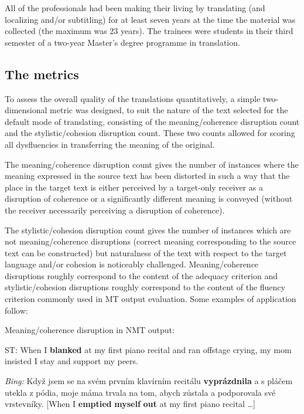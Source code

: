 \documentclass[output=paper]{langscibook}
\begin{document}
All of the professionals had been making their living by translating (and localizing and/or subtitling) for at least seven years at the time the material was collected (the maximum was 23 years). The trainees were students in their third semester of a two-year Master’s degree programme in translation.

\subsection{The metrics}

To assess the overall quality of the translations quantitatively, a simple two-dimensional metric was designed, to suit the nature of the text selected for the default mode of translating, consisting of the meaning/coherence disruption count and the stylistic/cohesion disruption count. These two counts allowed for scoring all dysfluencies in transferring the meaning of the original.

The meaning/coherence disruption count gives the number of instances where the meaning expressed in the source text has been distorted in such a way that the place in the target text is either perceived by a target-only receiver as a disruption of coherence or a significantly different meaning is conveyed (without the receiver necessarily perceiving a disruption of coherence).

The stylistic/cohesion disruption count gives the number of instances which are not meaning/coherence disruptions (correct meaning corresponding to the source text can be constructed) but naturalness of the text with respect to the target language and/or cohesion is noticeably challenged. Meaning/coherence disruptions roughly correspond to the content of the adequacy criterion and stylistic/cohesion disruptions roughly correspond to the content of the fluency criterion commonly used in MT output evaluation. Some examples of application follow:

\ea
Meaning/coherence disruption in NMT output:



{ST: When I \textbf{blanked} at my first piano recital and ran offstage crying, my mom insisted I stay and support my peers.}

\textit{Bing:} Když jsem se na svém prvním klavírním recitálu \textbf{vyprázdnila} a s pláčem utekla z pódia, moje máma trvala na tom, abych zůstala a podporovala své vrstevníky. [When I \textbf{emptied} \textbf{myself} \textbf{out} at my first piano recital …]
\z
\end{document}
